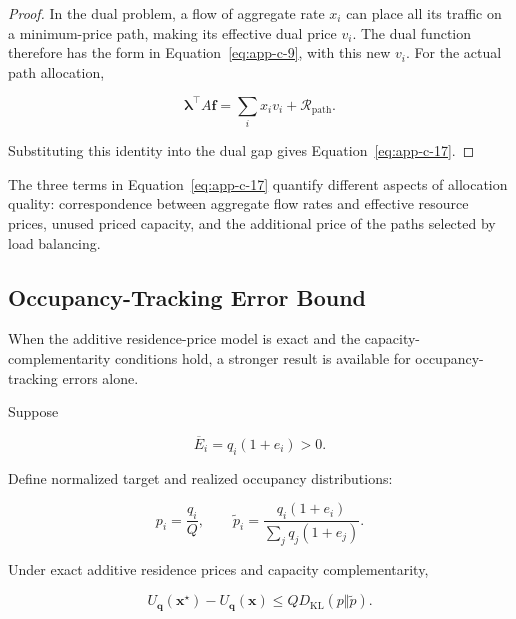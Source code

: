 \begin{proof} In the dual problem, a flow of aggregate rate \(x_i\) can place all its traffic on a minimum-price path, making its effective dual price \(v_i\). The dual function therefore has the form in Equation~\eqref{eq:app-c-9}, with this new \(v_i\). For the actual path allocation,

\[
\boldsymbol\lambda^\top A\mathbf f
=
\sum_ix_iv_i+\mathcal R_{\mathrm{path}}.
\]

Substituting this identity into the dual gap gives Equation~\eqref{eq:app-c-17}.
\end{proof}

The three terms in Equation~\eqref{eq:app-c-17} quantify different aspects of allocation quality: correspondence between aggregate flow rates and effective resource prices, unused priced capacity, and the additional price of the paths selected by load balancing.

\subsection{Occupancy-Tracking Error Bound}
\label{app:c-4}

When the additive residence-price model is exact and the capacity-complementarity conditions hold, a stronger result is available for occupancy-tracking errors alone.

Suppose

\begin{equation}
\label{eq:app-c-18}
\overline E_i=q_i(1+e_i)>0.
\end{equation}

Define normalized target and realized occupancy distributions:

\begin{equation}
\label{eq:app-c-19}
p_i=\frac{q_i}{Q},
\qquad
\widetilde p_i=
\frac{q_i(1+e_i)}
{\sum_jq_j(1+e_j)}.
\end{equation}

\begin{proposition}
\label{prop:c-1}
Under exact additive residence prices and capacity complementarity,

\begin{equation}
\label{eq:app-c-20}
\boxed{
U_{\mathbf q}(\mathbf x^\star)-U_{\mathbf q}(\mathbf x)
\le QD_{\mathrm{KL}}(p\Vert\widetilde p).
}
\end{equation}
\end{proposition}

